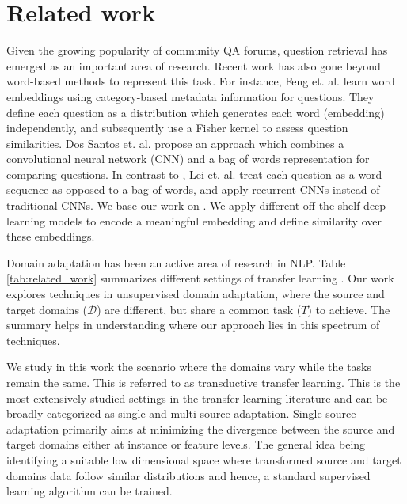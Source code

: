 \documentclass{sigkddExp}
\begin{document}
\section{Related work}
\label{related}
Given the growing popularity of community QA forums, question retrieval has emerged as an important area of research. Recent work has also gone beyond word-based methods to represent this task. For instance, Feng et. al. \cite{feng2015applying} learn word embeddings using category-based metadata information for questions. They define each question as a distribution which generates each word (embedding) independently, and subsequently use a Fisher kernel to assess question similarities. Dos Santos et. al. \cite{dos2015learning} propose an approach which combines a convolutional neural network (CNN) and a bag of words representation for comparing questions. In contrast to \cite{feng2015applying}, Lei et. al. \cite{lei2015semi} treat each question as a word sequence as opposed to a bag of words, and apply recurrent CNNs instead of traditional CNNs. We base our work on \cite{lei2015semi}. We apply different off-the-shelf deep learning models to encode a meaningful embedding and define similarity over these embeddings.

Domain adaptation has been an active area of research in NLP. Table \ref{tab:related_work}  summarizes different settings of transfer learning \cite{pan2010survey}. Our work explores techniques in unsupervised domain adaptation, where the source and target domains ($\mathcal{D}$) are different, but share a common task ($T$) to achieve. The summary helps in understanding where our approach lies in this spectrum of techniques.

We study in this work the scenario where the domains vary while the tasks remain the same. This is referred to as transductive transfer learning. This is the most extensively studied settings in the transfer learning literature and can be broadly categorized as single and multi-source adaptation. Single source adaptation\cite{chen2009extracting, ando2005framework, daume2009frustratingly} primarily aims at minimizing the divergence between the source and target domains either at instance or feature levels. The general idea being identifying a suitable low dimensional space where transformed source and target domains data follow similar distributions and hence, a standard supervised learning algorithm can be trained.
\end{document}
